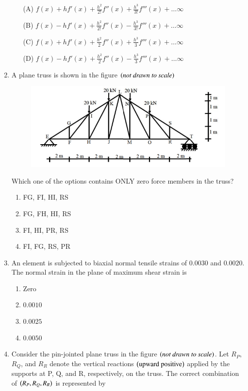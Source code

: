 \documentclass[journal,12pt,onecolumn]{IEEEtran}
\theoremstyle{remark}
\begin{document}
\begin{enumerate}
\hfill{}
\begin{enumerate}
\item[(A)] $f(x) + hf'(x) + \frac{h^2}{2!}f''(x) + \frac{h^3}{3!}f'''(x) + \ldots \infty$
\item[(B)] $f(x) - hf'(x) + \frac{h^2}{2!}f''(x) - \frac{h^3}{3!}f'''(x) + \ldots \infty$
\item[(C)] $f(x) + hf'(x) + \frac{h^2}{2}f''(x) + \frac{h^3}{3}f'''(x) + \ldots \infty$
\item[(D)] $f(x) - hf'(x) + \frac{h^2}{2}f''(x) - \frac{h^3}{3}f'''(x) + \ldots \infty$
\end{enumerate}

\item A plane truss is shown in the figure $\left(\textit{not drawn to scale}\right)$

\begin{figure}[H]
\centering
\includegraphics[width=0.5\columnwidth]{figs/q5.png}
\caption*{}
\label{fig:Q.5}
\end{figure}
Which one of the options contains ONLY zero force members in the truss?

\hfill{}
\begin{enumerate}
\item FG, FI, HI, RS
\item FG, FH, HI, RS
\item FI, HI, PR, RS
\item FI, FG, RS, PR
\end{enumerate}

\item An element is subjected to biaxial normal tensile strains of $0.0030$ and $0.0020$. The normal strain in the plane of maximum shear strain is

\hfill{}
\begin{enumerate}
\item Zero
\item $0.0010$
\item $0.0025$
\item $0.0050$
\end{enumerate}

\item Consider the pin-jointed plane truss in the figure $\left(\textit{not drawn to scale}\right)$. Let $R_P$, $R_Q$, and $R_R$ denote the vertical reactions $\left(\text{upward positive}\right)$ applied by the supports at P, Q, and R, respectively, on the truss. The correct combination of $\left(R_P,R_Q,R_R\right)$ is represented by


\end{enumerate}
\end{document}
